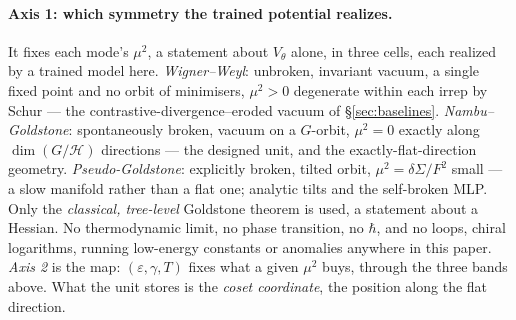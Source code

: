 \documentclass{article}
\begin{document}
\paragraph{Axis 1: which symmetry the trained potential realizes.} It fixes each mode's $\mu^2$, a statement about $V_\theta$ alone, in three cells, each realized by a trained model here. \emph{Wigner--Weyl}: unbroken, invariant vacuum, a single fixed point and no orbit of minimisers, $\mu^2>0$ degenerate within each irrep by Schur --- the contrastive-divergence--eroded vacuum of \S\ref{sec:baselines}. \emph{Nambu--Goldstone}: spontaneously broken, vacuum on a $G$-orbit, $\mu^2=0$ exactly along $\dim(G/\mathcal H)$ directions --- the designed unit, and the exactly-flat-direction geometry. \emph{Pseudo-Goldstone}: explicitly broken, tilted orbit, $\mu^2=\delta\Sigma/F^2$ small --- a slow manifold rather than a flat one; analytic tilts and the self-broken MLP. Only the \emph{classical, tree-level} Goldstone theorem is used, a statement about a Hessian. No thermodynamic limit, no phase transition, no $\hbar$, and no loops, chiral logarithms, running low-energy constants or anomalies anywhere in this paper. \emph{Axis 2} is the map: $(\varepsilon,\gamma,T)$ fixes what a given $\mu^2$ buys, through the three bands above. What the unit stores is the \emph{coset coordinate}, the position along the flat direction.
\end{document}
